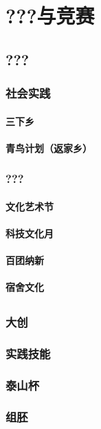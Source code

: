 \chapter[???与竞赛]{???与竞赛}
\section[???]{???}
\subsection[社会实践]{社会实践}
\subsubsection[三下乡]{三下乡}
\subsubsection[青鸟计划（返家乡）]{青鸟计划（返家乡）}
\subsection[???]{???}
\subsubsection[文化艺术节]{文化艺术节}
\subsubsection[科技文化月]{科技文化月}
\subsubsection[百团纳新]{百团纳新}
\subsubsection[宿舍文化]{宿舍文化}
\section[竞赛]{}
\subsection[大创]{大创}
\subsection[实践技能]{实践技能}
\subsection[泰山杯]{泰山杯}
\subsection[组胚]{组胚}

